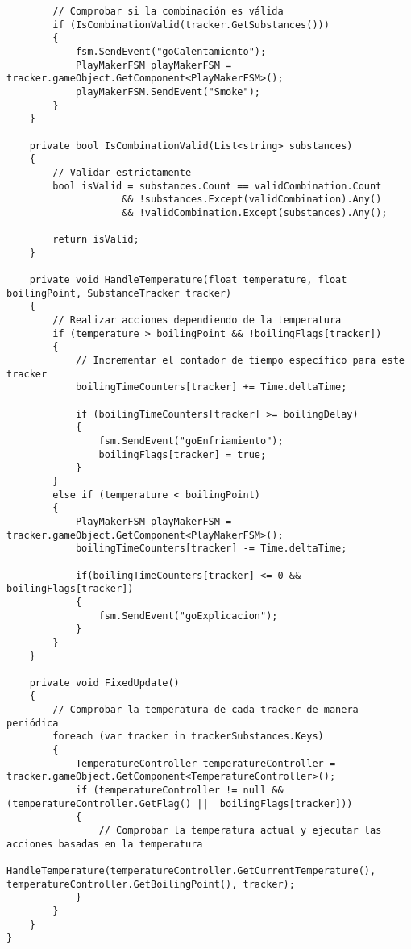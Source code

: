 \begin{verbatim}
        // Comprobar si la combinación es válida
        if (IsCombinationValid(tracker.GetSubstances()))
        {
            fsm.SendEvent("goCalentamiento");
            PlayMakerFSM playMakerFSM = tracker.gameObject.GetComponent<PlayMakerFSM>();
            playMakerFSM.SendEvent("Smoke");
        }
    }

    private bool IsCombinationValid(List<string> substances)
    {
        // Validar estrictamente
        bool isValid = substances.Count == validCombination.Count 
                    && !substances.Except(validCombination).Any() 
                    && !validCombination.Except(substances).Any();

        return isValid;
    }

    private void HandleTemperature(float temperature, float boilingPoint, SubstanceTracker tracker)
    {
        // Realizar acciones dependiendo de la temperatura
        if (temperature > boilingPoint && !boilingFlags[tracker])
        {
            // Incrementar el contador de tiempo específico para este tracker
            boilingTimeCounters[tracker] += Time.deltaTime;

            if (boilingTimeCounters[tracker] >= boilingDelay)
            {
                fsm.SendEvent("goEnfriamiento");
                boilingFlags[tracker] = true;
            }
        }
        else if (temperature < boilingPoint)
        {
            PlayMakerFSM playMakerFSM = tracker.gameObject.GetComponent<PlayMakerFSM>();
            boilingTimeCounters[tracker] -= Time.deltaTime;

            if(boilingTimeCounters[tracker] <= 0 && boilingFlags[tracker])
            {
                fsm.SendEvent("goExplicacion");
            }
        }
    }

    private void FixedUpdate()
    {
        // Comprobar la temperatura de cada tracker de manera periódica
        foreach (var tracker in trackerSubstances.Keys)
        {
            TemperatureController temperatureController = tracker.gameObject.GetComponent<TemperatureController>();
            if (temperatureController != null && (temperatureController.GetFlag() ||  boilingFlags[tracker]))
            {
                // Comprobar la temperatura actual y ejecutar las acciones basadas en la temperatura
                HandleTemperature(temperatureController.GetCurrentTemperature(), temperatureController.GetBoilingPoint(), tracker);
            }
        }
    }
}
\end{verbatim}
\newpage
